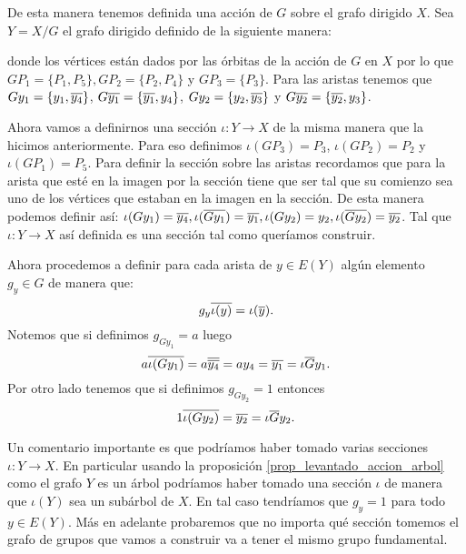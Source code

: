 \documentclass[tesis.tex]{subfiles}
\begin{document}
\begin{ej}
	De esta manera tenemos definida una acción de $G$ sobre el grafo dirigido $X$.
	Sea $Y=X/G$ el grafo dirigido definido de la siguiente manera:
	\begin{center}
	\end{center}
	donde los vértices están dados por las órbitas de la acción de $G$ en $X$  por lo que $GP_1 = \{ P_1, P_5 \}, GP_2 = \{ P_2, P_4  \}$ y $GP_3 = \{ P_3 \}$. Para las aristas tenemos que $Gy_1 = \{ y_1, \overline{y_4} \}$, $ {G\overline{y_1}} = \{ \overline{y_1}, y_4 \}$, $Gy_2 = \{ y_2, \overline{y_3} \}$ y ${G\overline{y_2}} = \{ \overline{y_2}, {y_3} \}$.
	
	Ahora vamos a definirnos una sección $\iota: Y \to X$ de la misma manera que la hicimos anteriormente.
	Para eso definimos $\iota(GP_3) = P_3$, $\iota(GP_2) = P_2$ y $\iota(GP_1) = P_5$.
	Para definir la sección sobre las aristas recordamos que para la arista que esté en la imagen por la sección tiene que ser tal que su comienzo sea uno de los vértices que estaban en la imagen en la sección.
	De esta manera podemos definir así:
	$\iota(Gy_1) = \overline{y_4}, \iota(\overline{Gy_1}) = \overline{y_1}, \iota(Gy_2) = y_2, \iota(\overline{Gy_2}) = \overline{y_2}$.
	Tal que $\iota: Y \to X$ así definida es una sección tal como queríamos construir.
	
	Ahora procedemos a definir para cada arista de $y \in E(Y)$ algún elemento $g_{y} \in G$ de manera que:
	\[
	g_y \overline{\iota(y)} = \iota(\overline y).
	\]
	Notemos que si definimos $g_{Gy_1} = a$ luego 
	\[
	a \overline{\iota(Gy_1)} = a\overline{\overline{ y_4}} = ay_4 = \overline{ y_1} = \iota{\overline Gy_1}. 
	\] 
	Por otro lado tenemos que si definimos $g_{Gy_2} = 1$ entonces
	\[
	1 \overline{\iota(Gy_2)} = \overline{y_2} = \iota{\overline Gy_2}. 
	\]
	
	
	Un comentario importante es que podríamos haber tomado varias secciones $\iota: Y \to X$. 
	En particular usando la proposición \ref{prop_levantado_accion_arbol} como el grafo $Y$ es un árbol podríamos haber tomado una sección $\iota$ de manera que $\iota(Y)$ sea un subárbol de $X$.
	En tal caso tendríamos que $g_y = 1$ para todo $y \in E(Y)$.
	Más en adelante probaremos que no importa qué sección tomemos el grafo de grupos que vamos a construir va a tener el mismo grupo fundamental.
\end{ej}
\end{document}
